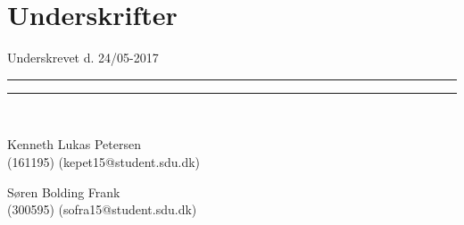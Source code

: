 
\section*{Underskrifter}
\vspace{3ex} \hfill Underskrevet d. 24/05-2017\\

\newlength{\streg} \setlength{\streg}{0.49\linewidth}

\vspace*{\fill} \rule{\streg}{1pt} \hfill \rule{\streg}{1pt}\\
\begin{minipage}[b]{\streg}
 \centering
 \rule{0pt}{4ex}
 Kenneth Lukas Petersen \\
 {\footnotesize (161195) (kepet15@student.sdu.dk)}
\end{minipage}
\hfill
\begin{minipage}[b]{\streg}
 \centering
Søren Bolding Frank \\
 {\footnotesize (300595) (sofra15@student.sdu.dk)}
\end{minipage}
\vspace*{\fill}